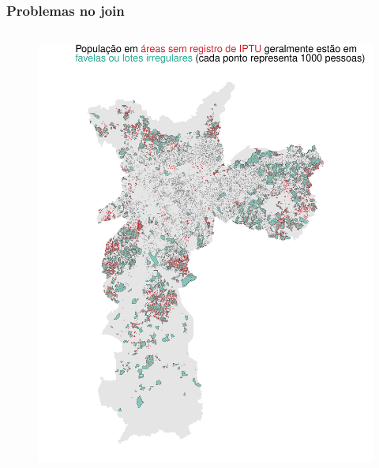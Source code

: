 \documentclass[%
    8pt, 
    aspectratio=169,
]{beamer}
\begin{document}
\begin{frame}
    \frametitle{Problemas no join}

    \begin{columns}[T]
        \begin{figure}
            \centering
            \includegraphics[width = 1\linewidth]{imagens/mapa_pontos.pdf}
        \end{figure}


\end{columns}
\end{frame}
\end{document}
